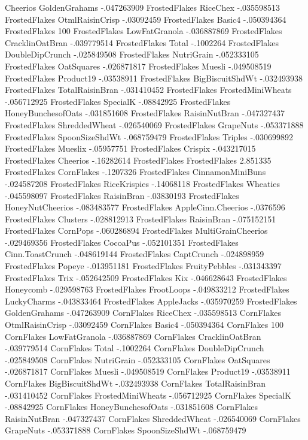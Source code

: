 Cheerios	GoldenGrahams	-.047263909
FrostedFlakes	RiceChex	-.035598513
FrostedFlakes	OtmlRaisinCrisp	-.03092459
FrostedFlakes	Basic4	-.050394364
FrostedFlakes	100%
FrostedFlakes	LowFatGranola	-.036887869
FrostedFlakes	CracklinOatBran	-.039779514
FrostedFlakes	Total	-.1002264
FrostedFlakes	DoubleDipCrunch	-.025849508
FrostedFlakes	NutriGrain	-.052333105
FrostedFlakes	OatSquares	-.026871817
FrostedFlakes	Muesli	-.049508519
FrostedFlakes	Product19	-.03538911
FrostedFlakes	BigBiscuitShdWt	-.032493938
FrostedFlakes	TotalRaisinBran	-.031410452
FrostedFlakes	FrostedMiniWheats	-.056712925
FrostedFlakes	SpecialK	-.08842925
FrostedFlakes	HoneyBunchesofOats	-.031851608
FrostedFlakes	RaisinNutBran	-.047327437
FrostedFlakes	ShreddedWheat	-.026540069
FrostedFlakes	GrapeNuts	-.053371888
FrostedFlakes	SpoonSizeShdWt	-.068759479
FrostedFlakes	Triples	-.030699892
FrostedFlakes	Mueslix	-.05957751
FrostedFlakes	Crispix	-.043217015
FrostedFlakes	Cheerios	-.16282614
FrostedFlakes	FrostedFlakes	2.851335
FrostedFlakes	CornFlakes	-.1207326
FrostedFlakes	CinnamonMiniBuns	-.024587208
FrostedFlakes	RiceKrispies	-.14068118
FrostedFlakes	Wheaties	-.045598097
FrostedFlakes	RaisinBran	-.03830193
FrostedFlakes	HoneyNutCheerios	-.083483577
FrostedFlakes	AppleCinn.Cheerios	-.0376596
FrostedFlakes	Clusters	-.028812913
FrostedFlakes	RaisinBran	-.075152151
FrostedFlakes	CornPops	-.060286894
FrostedFlakes	MultiGrainCheerios	-.029469356
FrostedFlakes	CocoaPus	-.052101351
FrostedFlakes	Cinn.ToastCrunch	-.048619144
FrostedFlakes	CaptCrunch	-.024898959
FrostedFlakes	Popeye	-.013951181
FrostedFlakes	FruityPebbles	-.031343397
FrostedFlakes	Trix	-.052642509
FrostedFlakes	Kix	-.046628643
FrostedFlakes	Honeycomb	-.029598763
FrostedFlakes	FrootLoops	-.049833212
FrostedFlakes	LuckyCharms	-.043833464
FrostedFlakes	AppleJacks	-.035970259
FrostedFlakes	GoldenGrahams	-.047263909
CornFlakes	RiceChex	-.035598513
CornFlakes	OtmlRaisinCrisp	-.03092459
CornFlakes	Basic4	-.050394364
CornFlakes	100%
CornFlakes	LowFatGranola	-.036887869
CornFlakes	CracklinOatBran	-.039779514
CornFlakes	Total	-.1002264
CornFlakes	DoubleDipCrunch	-.025849508
CornFlakes	NutriGrain	-.052333105
CornFlakes	OatSquares	-.026871817
CornFlakes	Muesli	-.049508519
CornFlakes	Product19	-.03538911
CornFlakes	BigBiscuitShdWt	-.032493938
CornFlakes	TotalRaisinBran	-.031410452
CornFlakes	FrostedMiniWheats	-.056712925
CornFlakes	SpecialK	-.08842925
CornFlakes	HoneyBunchesofOats	-.031851608
CornFlakes	RaisinNutBran	-.047327437
CornFlakes	ShreddedWheat	-.026540069
CornFlakes	GrapeNuts	-.053371888
CornFlakes	SpoonSizeShdWt	-.068759479
